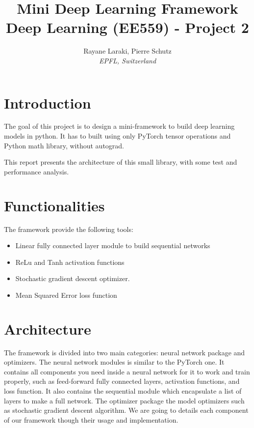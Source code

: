 \documentclass[10pt,conference,compsocconf]{IEEEtran}
\begin{document}
\title{ Mini Deep Learning Framework \\ Deep Learning (EE559) - Project 2 }

\author{
  Rayane Laraki, Pierre Schutz\\
  \textit{EPFL, Switzerland}
}


\maketitle

\section{Introduction}

The goal of this project is to design a mini-framework to build deep learning models in python. 
It has to built using only PyTorch tensor operations and Python math library, without autograd. 

This report presents the architecture of this small library, with some test and performance analysis.

\section{Functionalities}

The framework provide the following tools:
\begin{itemize}
    \item Linear fully connected layer module to build sequential networks
    \item ReLu and Tanh activation functions
    \item Stochastic gradient descent optimizer.
    \item Mean Squared Error loss function
\end{itemize}


\section{Architecture}

The framework is divided into two main categories: neural network package and optimizers. The neural network modules is similar to the PyTorch one. It contains all components you need inside a neural network for it to work and train properly, such as feed-forward fully connected layers, activation functions, and loss function. It also contains the sequential module which encapsulate a list of layers to make a full network. The optimizer package the model optimizers such as stochastic gradient descent algorithm. We are going to details each component of our framework though their usage and implementation.
\end{document}
